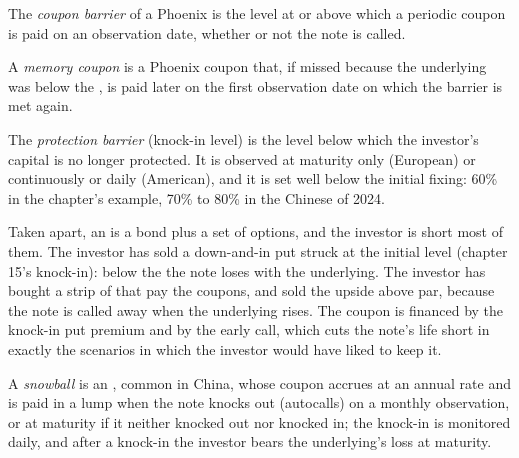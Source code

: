 \begin{definition}\label{def:dv:autocallables:couponbarrier}
The \emph{coupon barrier} of a Phoenix  is the level at or above which a periodic coupon is
paid on an observation date, whether or not the note is called.
\end{definition}

\begin{definition}\label{def:dv:autocallables:memory}
A \emph{memory coupon} is a Phoenix coupon that, if missed because the underlying was below the , is paid later on the first observation date on which the barrier is met again.
\end{definition}

\begin{definition}\label{def:dv:autocallables:protection}
The \emph{protection barrier} (knock-in level) is the level below which the investor's capital is
no longer protected. It is observed at maturity only (European) or continuously or daily (American), and it is set well below
the initial fixing: 60\% in the chapter's example, 70\% to 80\% in the Chinese  of 2024.
\end{definition}

Taken apart, an  is a bond plus a set of options, and the investor is short most of them. The investor has sold
a down-and-in put struck at the initial level (chapter 15's knock-in): below the  the note loses with the
underlying. The investor has bought a strip of  that pay the coupons, and sold the upside above par, because
the note is called away when the underlying rises. The coupon is financed by the knock-in put premium and by the early
call, which cuts the note's life short in exactly the scenarios in which the investor would have liked to keep it.

\begin{definition}[Snowball]\label{def:dv:autocallables:snowball}
A \emph{snowball} is an , common in China, whose coupon accrues at an annual rate and is paid in a
lump when the note knocks out (autocalls) on a monthly observation, or at maturity if it neither knocked out nor knocked in;
the knock-in is monitored daily, and after a knock-in the investor bears the underlying's loss at maturity.
\end{definition}

